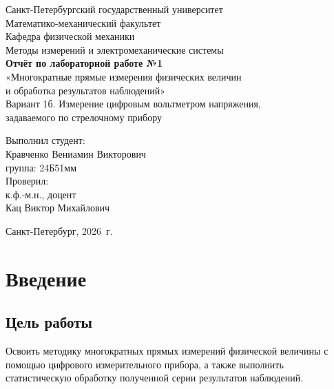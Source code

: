 \documentclass[12pt,a4paper]{article}
\begin{document}
\begin{titlepage}
\begin{center}
{\large Санкт-Петербургский государственный университет}\\[0.3cm]
{\large Математико-механический факультет}\\[0.3cm]
{\large Кафедра физической механики}\\[1.5cm]
{\large Методы измерений и электромеханические системы}\\[1.5cm]
{\LARGE \textbf{Отчёт по лабораторной работе №1}}\\[0.5cm]
{\Large «Многократные прямые измерения физических величин\\
и обработка результатов наблюдений»}\\[0.5cm]
{\large Вариант 1б. Измерение цифровым вольтметром напряжения,\\
задаваемого по стрелочному прибору}\\[2cm]
\end{center}
\begin{flushright}
{\large Выполнил студент:}\\
{\large Кравченко Вениамин Викторович}\\
{\large группа: 24Б51мм}\\[1cm]
{\large Проверил:}\\
{\large к.ф.-м.н., доцент}\\
{\large Кац Виктор Михайлович}\\
\end{flushright}
\vfill
\begin{center}
{\large Санкт-Петербург, 2026~г.}
\end{center}
\end{titlepage}

\tableofcontents
\newpage

\section{Введение}

\subsection{Цель работы}

Освоить методику многократных прямых измерений физической величины с помощью
цифрового измерительного прибора, а также выполнить статистическую обработку
полученной серии результатов наблюдений.
\end{document}
